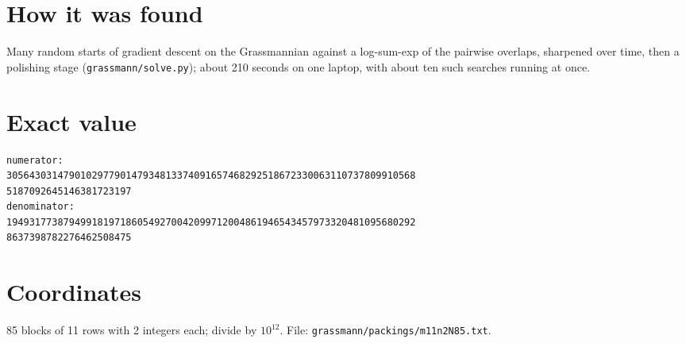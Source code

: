 \documentclass[11pt,a4paper]{article}
\begin{document}
\section{How it was found}
Many random starts of gradient descent on the Grassmannian against a log-sum-exp of the pairwise overlaps, sharpened over time, then a polishing stage (\texttt{grassmann/solve.py}); about 210 seconds on one laptop, with about ten such searches running at once.


\appendix
\section{Exact value}
{\small
\begin{verbatim}
numerator:
305643031479010297790147934813374091657468292518672330063110737809910568
5187092645146381723197
denominator:
194931773879499181971860549270042099712004861946543457973320481095680292
8637398782276462508475
\end{verbatim}}

\section{Coordinates}
85 blocks of 11 rows with 2 integers each; divide by $10^{12}$. File: \texttt{grassmann/packings/m11n2N85.txt}.
{\tiny
\begin{multicols}{4}
\end{multicols}}
\end{document}
